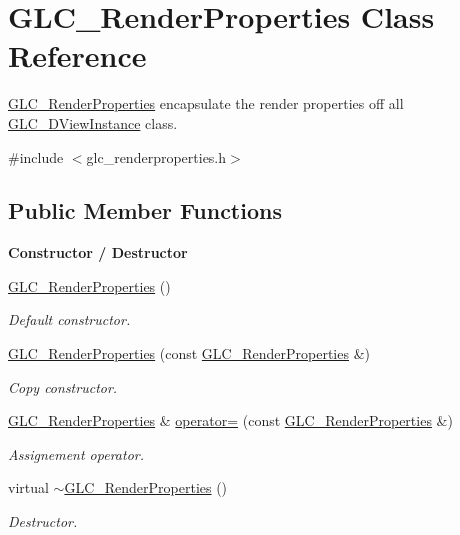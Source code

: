 \hypertarget{class_g_l_c___render_properties}{\section{G\-L\-C\-\_\-\-Render\-Properties Class Reference}
\label{class_g_l_c___render_properties}
}


\hyperlink{class_g_l_c___render_properties}{G\-L\-C\-\_\-\-Render\-Properties} encapsulate the render properties off all \hyperlink{class_g_l_c__3_d_view_instance}{G\-L\-C\-\_\-D\-View\-Instance} class.  




{\ttfamily \#include $<$glc\-\_\-renderproperties.\-h$>$}

\subsection*{Public Member Functions}
\begin{Indent}{\bf Constructor / Destructor}\par
\begin{DoxyCompactItemize}
\item 
\hyperlink{class_g_l_c___render_properties_a7bd0679991be90baf317dfe691caac67}{G\-L\-C\-\_\-\-Render\-Properties} ()
\begin{DoxyCompactList}\small\item\em Default constructor. \end{DoxyCompactList}\item 
\hyperlink{class_g_l_c___render_properties_a7eb73189f3d308097e8f95d3ded2b6fd}{G\-L\-C\-\_\-\-Render\-Properties} (const \hyperlink{class_g_l_c___render_properties}{G\-L\-C\-\_\-\-Render\-Properties} \&)
\begin{DoxyCompactList}\small\item\em Copy constructor. \end{DoxyCompactList}\item 
\hyperlink{class_g_l_c___render_properties}{G\-L\-C\-\_\-\-Render\-Properties} \& \hyperlink{class_g_l_c___render_properties_a81a0f843c3fd3a3c40e0fc29f0eb12c2}{operator=} (const \hyperlink{class_g_l_c___render_properties}{G\-L\-C\-\_\-\-Render\-Properties} \&)
\begin{DoxyCompactList}\small\item\em Assignement operator. \end{DoxyCompactList}\item 
virtual \hyperlink{class_g_l_c___render_properties_a73cbf9d2c10c5d8ba0d19fe1364b9a3e}{$\sim$\-G\-L\-C\-\_\-\-Render\-Properties} ()
\begin{DoxyCompactList}\small\item\em Destructor. \end{DoxyCompactList}\end{DoxyCompactItemize}
\end{Indent}
